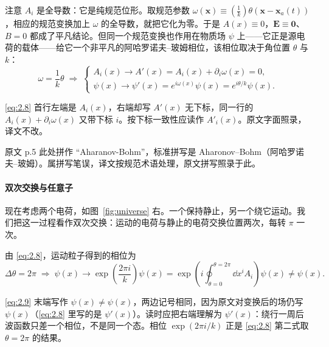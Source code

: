 注意 $A_i$ 是全导数：它是纯规范位形。取规范参数 $\omega(\mathbf{x})\equiv\left(\frac{1}{k}\right)\theta(\mathbf{x}-\mathbf{x}_a(t))$，相应的规范变换加上 $\omega$ 的全导数，就把它化为零。于是 $A(x)\equiv0$，$\mathbf{E}\equiv\mathbf{0}$、$B=0$ 都成了平凡结论。但同一个规范变换也作用在物质场 $\psi$ 上——它正是源电荷的载体——给它一个非平凡的阿哈罗诺夫–玻姆相位，该相位取决于角位置 $\theta$ 与 $k$：
\begin{equation}\tag{2.8}\label{eq:2.8}
  \omega = \frac{1}{k}\theta \;\Longrightarrow\;
  \begin{cases}
    A_i(x) \longrightarrow A'(x) = A_i(x) + \partial_i\omega(x) = 0,\\[2pt]
    \psi(x) \longrightarrow \psi'(x) = e^{i\omega(x)}\psi(x) = e^{i\theta/k}\psi(x).
  \end{cases}
\end{equation}

\begin{yizhu}[原文疑误]
\eqref{eq:2.8} 首行左端是 $A_i(x)$，右端却写 $A'(x)$ 无下标，同一行的 $A_i(x)+\partial_i\omega(x)$ 又带下标 $i$。按下标一致性应读作 $A'_i(x)$。原文字面照录，译文不改。
\end{yizhu}

\begin{yizhu}[原文疑误]
原文 p.5 此处拼作 “Aharanov-Bohm”，标准拼写是 Aharonov–Bohm（阿哈罗诺夫–玻姆）。属拼写笔误，译文按规范术语处理，原文拼写照录于此。
\end{yizhu}

\paragraph{双次交换与任意子} %
现在考虑两个电荷，如图~\ref{fig:universe} 右。一个保持静止，另一个绕它运动。我们把这一过程看作双次交换：运动的电荷与静止的电荷交换位置两次，每转 $\pi$ 一次。

由 \eqref{eq:2.8}，运动粒子得到的相位为
\begin{equation}\tag{2.9}\label{eq:2.9}
  \Delta\theta = 2\pi \;\Longrightarrow\;
  \psi(x) \longrightarrow \exp\!\left(\frac{2\pi i}{k}\right)\psi(x)
  = \exp\!\left(i\oint_{\theta=0}^{\theta=2\pi}\dd x^i A_i\right)\psi(x) \neq \psi(x) .
\end{equation}

\begin{yizhu}[含糊点]
\eqref{eq:2.9} 末端写作 $\psi(x)\neq\psi(x)$，两边记号相同，因为原文对变换后的场仍写 $\psi(x)$（\eqref{eq:2.8} 里写的是 $\psi'(x)$）。读时应把右端理解为 $\psi'(x)$：绕行一周后波函数只差一个相位，不是同一个态。相位 $\exp(2\pi i/k)$ 正是 \eqref{eq:2.8} 第二式取 $\theta=2\pi$ 的结果。
\end{yizhu}


